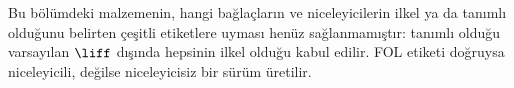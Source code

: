 

      {}
      {}

\begin{editorial}
  Bu bölümdeki malzemenin, hangi bağlaçların ve niceleyicilerin ilkel ya da
  tanımlı olduğunu belirten çeşitli etiketlere uyması henüz sağlanmamıştır:
  tanımlı olduğu varsayılan $\liff$ dışında hepsinin ilkel olduğu kabul edilir.
  FOL etiketi doğruysa niceleyicili, değilse niceleyicisiz bir sürüm üretilir.
\end{editorial}














\OLEndChapterHook

